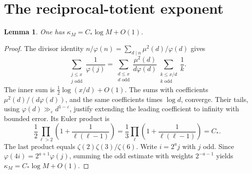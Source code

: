 \documentclass[11pt,a4paper]{amsart}
\newtheorem{lemma}[theorem]{Lemma}
\theoremstyle{definition}\newtheorem{definition}[theorem]{Definition}
\newcommand{\eps}{\varepsilon}
\begin{document}
\section{The reciprocal-totient exponent}
\begin{lemma}\label{lem:kappa}
One has $\kappa_M=C_*\log M+O(1)$.
\end{lemma}
\begin{proof}
The divisor identity
$n/\varphi(n)=\sum_{d\mid n}\mu^2(d)/\varphi(d)$ gives
\[
 \sum_{\substack{j\le x\\j\text{ odd}}}\frac1{\varphi(j)}
 =\sum_{\substack{d\le x\\d\text{ odd}}}
   \frac{\mu^2(d)}{d\varphi(d)}
   \sum_{\substack{k\le x/d\\k\text{ odd}}}\frac1k .
\]
The inner sum is $\frac12\log(x/d)+O(1)$.
The sums with coefficients $\mu^2(d)/(d\varphi(d))$, and the
same coefficients times $\log d$, converge. Their tails,
using $\varphi(d)\gg_\eps d^{1-\eps}$, justify extending
the leading coefficient to infinity with bounded error.
Its Euler product is
\[
 \frac12\prod_{\ell>2}\left(1+\frac1{\ell(\ell-1)}\right)
 =\frac13\prod_\ell\left(1+\frac1{\ell(\ell-1)}\right)=C_*.
\]
The last product equals $\zeta(2)\zeta(3)/\zeta(6)$.
Write $i=2^a j$ with $j$ odd. Since
$\varphi(4i)=2^{a+1}\varphi(j)$, summing the odd estimate
with weights $2^{-a-1}$ yields
$\kappa_M=C_*\log M+O(1)$.
\end{proof}
\end{document}
